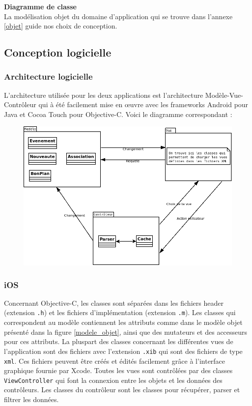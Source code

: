\documentclass[a4paper, 11pt]{article}
\begin{document}
\textbf{Diagramme de classe}\\
La modélisation objet du domaine d'application qui se trouve dans l'annexe \ref{objet} guide nos choix de conception.

\subsection{Conception logicielle}

\subsubsection{Architecture logicielle}
L'architecture utilisée pour les deux applications est l'architecture Modèle-Vue-Contrôleur qui à été facilement mise en œuvre avec les frameworks Android pour Java et Cocoa Touch pour Objective-C. Voici le diagramme correspondant :
\begin{figure}[h!]
\begin{center}
\includegraphics[scale=0.3]{MVC.png}
\end{center}
\end{figure}

\subsubsection{iOS}
Concernant Objective-C, les classes sont séparées dans les fichiers header (extension \texttt{.h}) et les fichiers d'implémentation (extension \texttt{.m}).
Les classes qui correspondent au modèle contiennent les attributs comme dans le modèle objet présenté dans la figure \ref{modele_objet}, ainsi que des mutateurs et des accesseurs pour ces attributs. La pluspart des classes concernant les différentes vues de l'application sont des fichiers avec l'extension \texttt{.xib} qui sont des fichiers de type \texttt{xml}. Ces fichiers peuvent être créés et édités facilement grâce à l'interface graphique fournie par Xcode. Toutes les vues sont contrôlées par des classes \texttt{ViewController} qui font la connexion entre les objets et les données des contrôleurs.
Les classes du contrôleur sont les classes pour récupérer, parser et filtrer les données.\\
\end{document}

